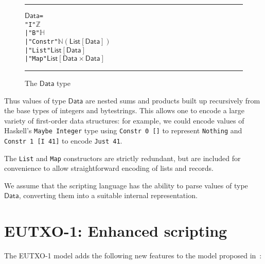 \documentclass[a4paper]{article}
\newcommand{\s}{\textsf}  %
\newcommand\rfskip{7pt}
\newenvironment{ruledfigure}[1]{\begin{figure}[#1]\hrule\vspace{\rfskip}}{\vspace{\rfskip}\hrule\end{figure}}
\newcommand{\List}[1]{\ensuremath{\s{List}[#1]}}
\newcommand{\Data}{\ensuremath{\s{Data}}}
\newcommand\N{\ensuremath{\mathbb{N}}}
\newcommand\Z{\ensuremath{\mathbb{Z}}}
\renewcommand\H{\ensuremath{\mathbb{H}}}
\begin{document}
\begin{ruledfigure}{H}
\begin{alltt}
  \Data =
      "I" \(\Z\)
    | "B" \(\H\)
    | "Constr" \(\N (\List{\Data})\)
    | "List" \(\List{\Data}\)
    | "Map" \(\List{\Data\times\Data}\)
\end{alltt}
\caption{The \Data{} type}
\label{fig:data-defn}
\end{ruledfigure}

\noindent Thus values of type \Data{} are nested sums and products
built up recursively from the base types of integers and
bytestrings. This allows one to encode a large variety of first-order
data structures: for example, we could encode values of Haskell's
\verb|Maybe Integer| type using \verb|Constr 0 []| to represent
\verb|Nothing| and \verb|Constr 1 [I 41]| to encode \verb|Just 41|.


The \texttt{List} and \texttt{Map} constructors are strictly
redundant, but are included for convenience to allow straightforward
encoding of lists and records.

We assume that the scripting language has the ability to parse values
of type \Data{}, converting them into a suitable internal representation.


\section{EUTXO-1: Enhanced scripting}
\label{sec:eutxo-1}
The EUTXO-1 model adds the following new features to the model
proposed in~\citep{Zahnentferner18-UTxO}:
\end{document}
